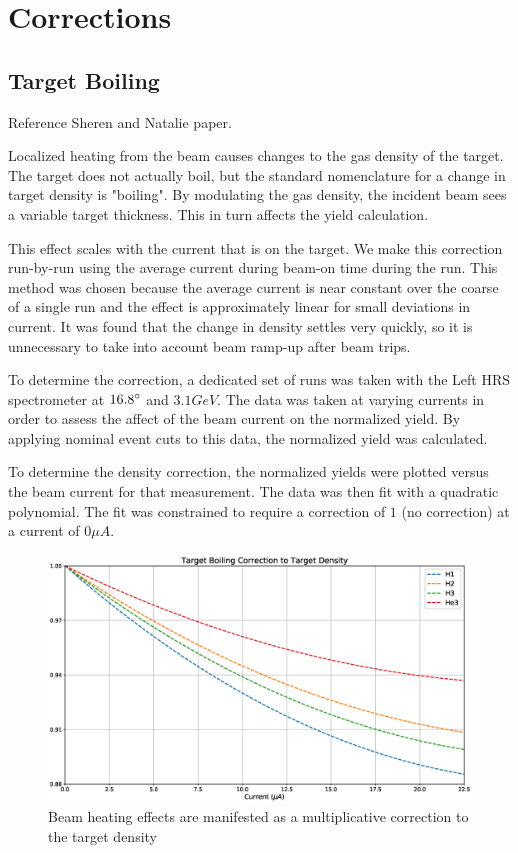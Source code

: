 \section{Corrections}

\subsection{Target Boiling}
\label{sec:boiling}

Reference Sheren and Natalie paper.

Localized heating from the beam causes changes to the gas density of the target. The target does not actually boil, but the standard nomenclature for a change in target density is "boiling". By modulating the gas density, the incident beam sees a variable target thickness. This in turn affects the yield calculation.

This effect scales with the current that is on the target. We make this correction run-by-run using the average current during beam-on time during the run. This method was chosen because the average current is near constant over the coarse of a single run and the effect is approximately linear for small deviations in current. It was found that the change in density settles very quickly, so it is unnecessary to take into account beam ramp-up after beam trips.

To determine the correction, a dedicated set of runs was taken with the Left HRS spectrometer at $16.8\degree$ and $3.1GeV$. The data was taken at varying currents in order to assess the affect of the beam current on the normalized yield. By applying nominal event cuts to this data, the normalized yield was calculated. 

To determine the density correction, the normalized yields were plotted versus the beam current for that measurement. The data was then fit with a quadratic polynomial. The fit was constrained to require a correction of $1$ (no correction) at a current of $0 \mu A$.

\begin{figure}
	\includegraphics[width=\textwidth]{./analysis/fig/boil_cor.eps}
	\caption{Beam heating effects are manifested as a multiplicative correction to the target density}
	\label{fig:boilcor}
\end{figure}

